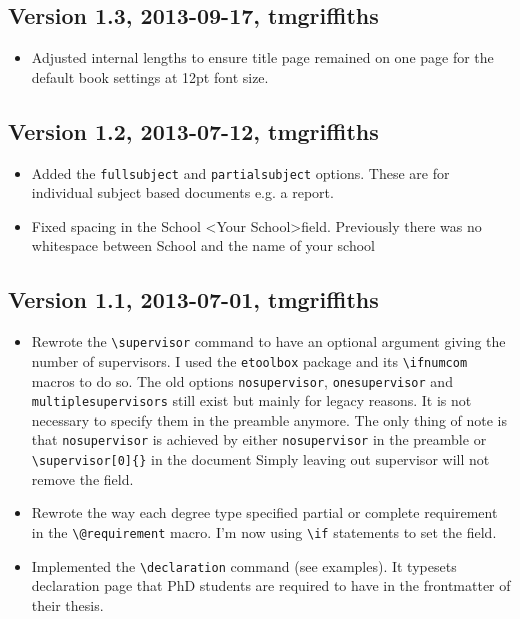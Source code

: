 \documentclass[12pt,oneside]{article}
\newcommand{\oporcom}[1]{\texttt{\color{Red}#1}} %
\begin{document}
\subsection*{Version 1.3, 2013-09-17, tmgriffiths}
\begin{itemize}
    \item Adjusted internal lengths to ensure title page remained on one page for the default book settings at 12pt font size.
\end{itemize}

\subsection*{Version 1.2, 2013-07-12, tmgriffiths}
\begin{itemize}
    \item Added the \oporcom{fullsubject} and \oporcom{partialsubject} options. These are for individual subject based documents e.g. a report.
    \item Fixed spacing in the School \textless{}Your School\textgreater field. Previously there was no whitespace between School and the name of your school
\end{itemize}    
\subsection*{Version 1.1, 2013-07-01, tmgriffiths}
\begin{itemize}
    \item Rewrote the \oporcom{\textbackslash{}supervisor} command to have an optional argument giving the number of supervisors. I used the \texttt{etoolbox} package and its \texttt{\textbackslash{}ifnumcom} macros to do so. The old options \oporcom{nosupervisor}, \oporcom{onesupervisor} and \oporcom{multiplesupervisors} still exist but mainly for legacy reasons. It is not necessary to specify them in the preamble anymore. The only thing of note is that \oporcom{nosupervisor} is achieved by either \oporcom{nosupervisor} in the preamble or \oporcom{\textbackslash{}supervisor}\texttt{[0]\{\}} in the document Simply leaving out supervisor will not remove the field.
    \item Rewrote the way each degree type specified partial or complete requirement in the \oporcom{\textbackslash{}@requirement} macro. I'm now using \texttt{\textbackslash{}if} statements to set the field.
    \item Implemented the \oporcom{\textbackslash{}declaration} command (see examples). It typesets declaration page that PhD students are required to have in the frontmatter of their thesis.
\end{itemize}
\end{document}
